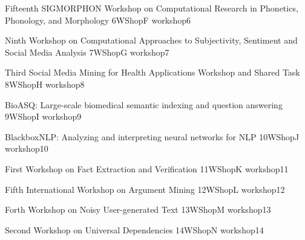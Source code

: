       \begin{wsschedule}
      {Fifteenth SIGMORPHON Workshop on Computational Research in Phonetics, Phonology, and Morphology}
      {6}{WShopF}
      {workshop6}
      {\WShopLocF}
      
      \end{wsschedule}
      

      \begin{wsschedule}
      {Ninth Workshop on Computational Approaches to Subjectivity, Sentiment and Social Media Analysis}
      {7}{WShopG}
      {workshop7}
      {\WShopLocG}
      
      \end{wsschedule}
      

      \begin{wsschedule}
      {Third Social Media Mining for Health Applications Workshop and Shared Task}
      {8}{WShopH}
      {workshop8}
      {\WShopLocH}
      
      \end{wsschedule}




 \begin{wsschedule}
      {BioASQ: Large-scale biomedical semantic indexing and question answering}
      {9}{WShopI}
      {workshop9}
      {\WShopLocI}
      
      \end{wsschedule}
      

      \begin{wsschedule}
      {BlackboxNLP: Analyzing and interpreting neural networks for NLP}
      {10}{WShopJ}
      {workshop10}
      {\WShopLocJ}
      
      \end{wsschedule}
      

      \begin{wsschedule}
      {First Workshop on Fact Extraction and Verification}
      {11}{WShopK}
      {workshop11}
      {\WShopLocK}
      
      \end{wsschedule}
      

      \begin{wsschedule}
      {Fifth International Workshop on Argument Mining}
      {12}{WShopL}
      {workshop12}
      {\WShopLocL}
      
      \end{wsschedule}
      

      \begin{wsschedule}
      {Forth Workshop on Noisy User-generated Text}
      {13}{WShopM}
      {workshop13}
      {\WShopLocM}
      
      \end{wsschedule}
      

      \begin{wsschedule}
      {Second Workshop on Universal Dependencies}
      {14}{WShopN}
      {workshop14}
      {\WShopLocN}
      
      \end{wsschedule}

\clearpage{\thispagestyle{emptyheader}\cleardoublepage}
